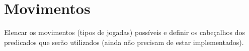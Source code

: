 \documentclass[a4paper]{article}
\begin{document}
\section{Movimentos}

Elencar os movimentos (tipos de jogadas) possíveis e definir os cabeçalhos dos predicados que serão utilizados (ainda não precisam de estar implementados).
\end{document}
